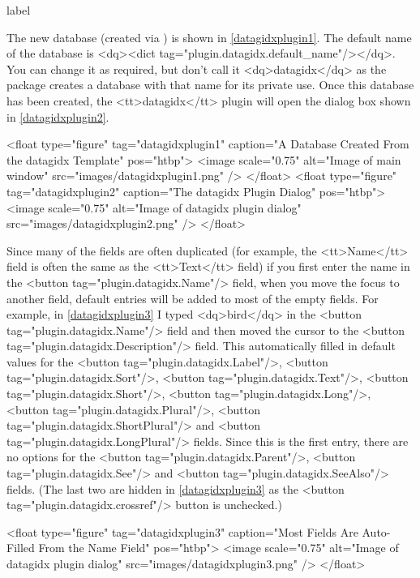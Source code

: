 \begin{example}{label}{}

   The new database (created via ) is
   shown in \autoref{datagidxplugin1}. The default name of the database
   is <dq><dict tag="plugin.datagidx.default_name"/></dq>. You can change it 
   as required, but don't call it <dq>datagidx</dq> as the  
   package creates a database with that name for its private use.
   Once this database has been created, the <tt>datagidx</tt> plugin will 
   open the dialog box shown in \autoref{datagidxplugin2}.

     <float type="figure" tag="datagidxplugin1" caption="A Database Created From the datagidx Template" pos="htbp">
      <image scale="0.75" alt="Image of main window" src="images/datagidxplugin1.png" />
     </float>
     <float type="figure" tag="datagidxplugin2" caption="The datagidx Plugin Dialog" pos="htbp">
      <image scale="0.75" alt="Image of datagidx plugin dialog" src="images/datagidxplugin2.png" />
     </float>

   Since many of the fields are often duplicated (for example, the 
   <tt>Name</tt> field is often the same as the <tt>Text</tt> field)
   if you first enter the name in the <button tag="plugin.datagidx.Name"/>
   field, when you move the focus to another field, default entries will 
   be added to most of the empty fields. For example, in 
   \autoref{datagidxplugin3} I typed <dq>bird</dq> in the
   <button tag="plugin.datagidx.Name"/> field and then moved the cursor to
   the <button tag="plugin.datagidx.Description"/> field. This automatically
   filled in default values for the <button tag="plugin.datagidx.Label"/>,
   <button tag="plugin.datagidx.Sort"/>,
   <button tag="plugin.datagidx.Text"/>,
   <button tag="plugin.datagidx.Short"/>,
   <button tag="plugin.datagidx.Long"/>,
   <button tag="plugin.datagidx.Plural"/>,
   <button tag="plugin.datagidx.ShortPlural"/> and
   <button tag="plugin.datagidx.LongPlural"/> fields.
   Since this is the first entry, there are no options for the
   <button tag="plugin.datagidx.Parent"/>,
   <button tag="plugin.datagidx.See"/> and 
   <button tag="plugin.datagidx.SeeAlso"/> fields. (The last two are hidden in
   \autoref{datagidxplugin3} as the <button tag="plugin.datagidx.crossref"/>
   button is unchecked.)

     <float type="figure" tag="datagidxplugin3" caption="Most Fields Are Auto-Filled From the Name Field" pos="htbp">
      <image scale="0.75" alt="Image of datagidx plugin dialog" src="images/datagidxplugin3.png" />
     </float>


\end{example}
